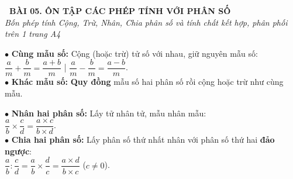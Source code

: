 \documentclass[14pt,a4paper,oneside]{extbook}
\begin{document}
\noindent
\begin{tcolorbox}[
  enhanced,
  colback=teal!8!white,
  colframe=teal!80!black,
  arc=3mm,
  boxrule=1.1pt,
  width=\linewidth,
  halign=center,
  top=2.2mm, bottom=2.2mm,
  left=3mm, right=3mm,
  drop fuzzy shadow
]
  {\large\bfseries\color{teal!95!black}\faBookmark\ BÀI 05. ÔN TẬP CÁC PHÉP TÍNH VỚI PHÂN SỐ}\\[2pt]
  {\scriptsize\color{black!75}\itshape Bốn phép tính Cộng, Trừ, Nhân, Chia phân số và tính chất kết hợp, phân phối trên 1 trang A4}
\end{tcolorbox}

\vspace{3.2mm}
\noindent
\begin{minipage}[t]{0.50\textwidth}
  \begin{tcolorbox}[
    enhanced,
    title={\footnotesize\bfseries\color{white}\faPlusSquare\ 1. Cộng và trừ phân số},
    colback=blue!2!white,
    colframe=blue!75!black,
    arc=2.5mm, boxrule=0.8pt, top=1.8mm, bottom=1.8mm, left=2.2mm, right=2.2mm
  ]
    \footnotesize
    $\bullet$ \textbf{Cùng mẫu số:} Cộng (hoặc trừ) tử số với nhau, giữ nguyên mẫu số:\\
    \quad $\dfrac{a}{m} + \dfrac{b}{m} = \dfrac{a + b}{m}$ \quad | \quad $\dfrac{a}{m} - \dfrac{b}{m} = \dfrac{a - b}{m}$.\\[2pt]
    $\bullet$ \textbf{Khác mẫu số:} \textbf{Quy đồng} mẫu số hai phân số rồi cộng hoặc trừ như cùng mẫu.
  \end{tcolorbox}
\end{minipage}%
\hfill
\begin{minipage}[t]{0.48\textwidth}
  \begin{tcolorbox}[
    enhanced,
    title={\footnotesize\bfseries\color{white}\faTimesCircle\ 2. Nhân và chia phân số},
    colback=teal!2!white,
    colframe=teal!75!black,
    arc=2.5mm, boxrule=0.8pt, top=1.8mm, bottom=1.8mm, left=2mm, right=2mm
  ]
    \footnotesize
    $\bullet$ \textbf{Nhân hai phân số:} Lấy tử nhân tử, mẫu nhân mẫu:\\
    \quad $\dfrac{a}{b} \times \dfrac{c}{d} = \dfrac{a \times c}{b \times d}$.\\[2pt]
    $\bullet$ \textbf{Chia hai phân số:} Lấy phân số thứ nhất nhân với phân số thứ hai \textbf{đảo ngược}:\\
    \quad $\dfrac{a}{b} : \dfrac{c}{d} = \dfrac{a}{b} \times \dfrac{d}{c} = \dfrac{a \times d}{b \times c}$ ($c \neq 0$).
  \end{tcolorbox}
\end{minipage}
\end{document}
